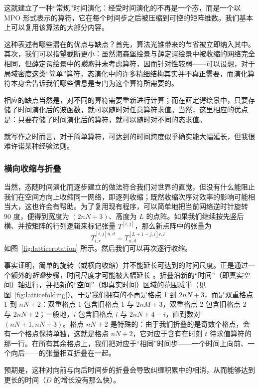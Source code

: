 这就建立了一种“常规”时间演化：经受时间演化的不再是一个态，而是一个以 MPO 形式表示的算符，它在每个时间步之后被压缩到可控的矩阵维数。我们基本上可以复用该算法的大部分内容。

这种表述有哪些潜在的优点与缺点？首先，算法光锥带来的节省被立即纳入其中。其次，我们可以指望截断更小：虽然海森堡绘景与薛定谔绘景中被收缩的网络完全相同，但薛定谔绘景中的{\em 截断}并未考虑算符，因而针对性较弱——可以设想，对于局域密度这类“简单”算符，态演化中的许多精细结构其实并不真正需要，而演化算符本身会告诉我们哪些信息是专门为这个算符所需要的。

相应的缺点当然是，对不同的算符需要重新进行计算；而在薛定谔绘景中，只要存储了时间演化后的波函数，就可以随时对任意算符求值。当然，这里相应的优点是：只要存储了时间演化后的算符，就可以随时对不同的态求值。

就写作之时而言，对于简单算符，可达到的时间跨度似乎确实能大幅延长，但我很难许诺某种经验法则。

\subsubsection{横向收缩与折叠}

当然，态随时间演化而逐步建立的做法符合我们对世界的直觉，但没有什么能阻止我们在空间方向上收缩同一网络，即逐列收缩；既然收缩次序对效率的影响可能相当大，这也许会有帮助。为了复用现有程序，可以简单地把当前网络逆时针旋转 90 度，便得到宽度为 $(2nN+3)$、高度为 $L$ 的点阵。如果我们继续按先竖后横、并按矩阵的行列逻辑来标记张量 $T^{[i,j]}$，那么新点阵中的张量为
\begin{equation}
\overline{T}^{[i,j] u,d}_{l,r} = T^{[L+1-j,i] r,l}_{u,d} ,
\end{equation}
如图~\ref{fig:latticerotation} 所示。然后我们可以再次逐行收缩。

事实证明，简单的旋转（或横向收缩）并不能延长可达到的时间尺度。正是通过一个额外的{\em 折叠}步骤，时间尺度才可能被大幅延长 \cite{Banuls09}。折叠沿新的“时间”（即真实空间）轴进行，并把新的“空间”（即真实时间）区域的范围减半（见图~\ref{fig:latticefolding}）。于是我们拥有的不再是格点 1 到 $2nN+3$，而是双重格点 1 到 $nN+2$：双重格点 1 包含旧格点 1 与 $2nM+3$，双重格点 2 包含旧格点 2 与 $2nN+2$；一般地，$i$ 包含旧格点 $i$ 与 $2nN+4-i$，直到数对 $(nN+1, nN+3)$。格点 $nN+2$ 是特殊的：由于我们折叠的是奇数个格点，会有一个格点保持单独，这就是格点 $nN+2$，它对应于含有在时刻 $t$ 待求值算符的那一行。在所有其余格点上，我们把对应于“相同”时间步——一个时间上向前、一个向后——的张量相互折叠在一起。

预期是，这种对向前与向后时间步的折叠会导致纠缠积累中的相消，从而能够达到更长的时间（$D$ 的增长没有那么快）。

